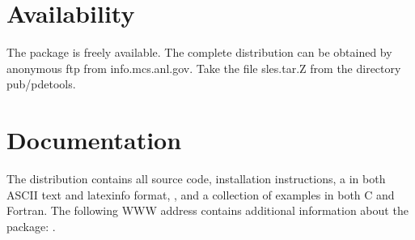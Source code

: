 \section*{Availability}

The  package is freely available.
The complete distribution can be obtained by anonymous ftp from
info.mcs.anl.gov.  Take the file sles.tar.Z from the directory pub/pdetools.

\section*{Documentation}

The  distribution contains all source code, 
installation instructions, a 
in both ASCII text and latexinfo format,
, 
and a collection of examples in both C and Fortran.  
The following WWW address contains additional information about the
package: .

\makeinfo

